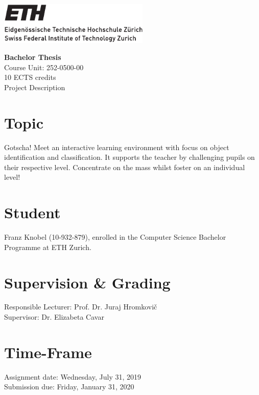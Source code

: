 \documentclass[a4paper,oneside,11pt,final]{scrartcl}
\newcommand{\ethz}{ETH Zurich}
\newcommand{\student}{Franz Knobel}
\newcommand{\professor}{Prof. Dr. Juraj Hromkovi\v{c}}
\newcommand{\cosupervisor}{Dr. Elizabeta Cavar}
\begin{document}
\noindent\includegraphics[height=20mm]{ETHlogo_13} %



\vspace{2cm}
\begin{center}
	{\huge\bfseries Bachelor Thesis} \\
	Course Unit: 252-0500-00\\
	10 ECTS credits\\
	\huge Project Description
	\vspace{3mm}
\end{center}
\vspace{1cm}

\section*{Topic} 
Gotscha! Meet an interactive learning environment with focus on object
identification and classification. It supports the teacher by challenging pupils
on their respective level. Concentrate on the mass whilst foster on an
individual level! 

\section*{Student}
\student{} (10-932-879), enrolled in the Computer Science Bachelor Programme at
\ethz.

\section*{Supervision \& Grading}
Responsible Lecturer: \professor \\
Supervisor: \cosupervisor

\section*{Time-Frame}
Assignment date: Wednesday, July 31, 2019\\
Submission due: Friday, January 31, 2020
\end{document}

